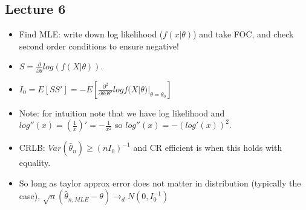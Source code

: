 \documentclass[11pt]{article} %
\begin{document}
\subsection{Lecture 6}
\begin{itemize}
\item Find MLE: write down log likelihood ($f(x|\theta)$) and take FOC, and check second order conditions to ensure negative!
\item $S = \frac{\partial}{\partial \theta}log(f(X|\theta)).$
\item $I_0 = E[SS'] = -E\left[ \frac{\partial^2}{\partial\theta\partial\theta'}log f(X|\theta)|_{\theta = \theta_0} \right]$
\item Note: for intuition note that we have log likelihood and $log''(x) =  (\frac{1}{x})' = -\frac{1}{x^2}$ so $log''(x) =- (log'(x))^2.$
\item CRLB: $Var(\hat{\theta}_n) \geq (nI_0)^{-1}$ and CR efficient is when this holds with equality.
\item So long as taylor approx error does not matter in distribution (typically the case), $\sqrt{n}(\hat{\theta}_{n,MLE} - \theta) \rightarrow_d N(0,I_0^{-1})$
\end{itemize}
\end{document}
